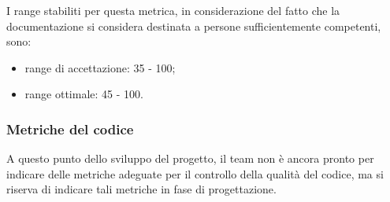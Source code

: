 		I range stabiliti per questa metrica, in considerazione del fatto che la documentazione si considera destinata a persone sufficientemente competenti, sono:
		\begin{itemize}
			\item range di accettazione: 35 - 100;
			\item range ottimale: 45 - 100.
		\end{itemize}
	\subsubsection{Metriche del codice}
		A questo punto dello sviluppo del progetto, il team non è ancora pronto per indicare delle metriche adeguate per il controllo della qualità del codice, ma si riserva di indicare tali metriche in fase di progettazione.